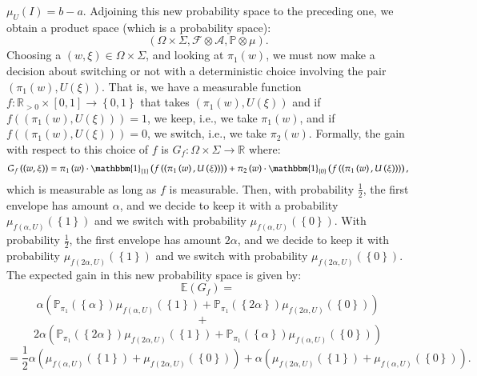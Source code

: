 \documentclass[11pt, a4paper, oneside]{article}
\theoremstyle{remark}
\theoremstyle{lemma}
\begin{document}
$\mu_{U}(I)= b-a$.
Adjoining this new probability space to the preceding one, we obtain a product space (which is a probability space):
$$\left(\Omega\times\Sigma,\mathcal{F}\otimes\mathcal{A},\mathbb{P}\otimes\mu\right).$$ Choosing a $\left(w,\xi\right)\in \Omega\times\Sigma$, and looking at $\pi_1\left(w\right)$, we must now make a decision about switching or not with a deterministic choice involving the pair $\left(\pi_1\left(w\right),U\left(\xi\right)\right)$. That is, we have a measurable function $f:\mathbb{R}_{>0}\times\left[0,1\right]\rightarrow\left\{0,1\right\}$ that takes $\left(\pi_1\left(w\right),U\left(\xi\right)\right)$ and if $f\left(\left(\pi_{1}\left(w\right),U\left(\xi\right)\right)\right)=1$, we keep, i.e., we take $\pi_1\left(w\right)$, and if $f\left(\left(\pi_{1}\left(w\right),U\left(\xi\right)\right)\right)=0$, we switch, i.e., we take $\pi_2\left(w\right)$. Formally, the gain with respect to this choice of $f$ is $G_f:\Omega\times\Sigma\rightarrow\mathbb{R}$ where:
$$G_f\left(\left(w,\xi\right)\right)=\pi_1\left(w\right)\cdot\mathbbm{1}_{\left\{1\right\}}\left(f\left(\left(\pi_{1}\left(w\right),U\left(\xi\right)\right)\right)\right)+\pi_2\left(w\right)\cdot\mathbbm{1}_{\left\{0\right\}}\left(f\left(\left(\pi_{1}\left(w\right),U\left(\xi\right)\right)\right)\right),$$
which is measurable as long as $f$ is measurable. Then, with probability $\frac{1}{2}$, the first envelope has amount $\alpha$, and we decide to keep it with a probability $\mu_{f\left(\alpha, U\right)}\left(\left\{1\right\}\right)$ and we switch with probability $\mu_{f\left(\alpha, U\right)}\left(\left\{0\right\}\right)$. With probability $\frac{1}{2}$, the first envelope has amount $2\alpha$, and we decide to keep it with probability $\mu_{f\left(2\alpha, U\right)}\left(\left\{1\right\}\right)$ and we switch with probability $\mu_{f\left(2\alpha, U\right)}\left(\left\{0\right\}\right)$. 
The expected gain in this new probability space is given by:
\[
\mathbb{E}\left(G_f\right) = 
\]
\[
\alpha\left(\mathbb{P}_{\pi_1}\left(\left\{\alpha\right\}\right)\mu_{f\left(\alpha, U\right)}\left(\left\{1\right\}\right) + \mathbb{P}_{\pi_1}\left(\left\{2\alpha\right\}\right)\mu_{f\left(2\alpha, U\right)}\left(\left\{0\right\}\right)\right)
\]
\[
+ \quad
\]
\[
2\alpha\left(\mathbb{P}_{\pi_1}\left(\left\{2\alpha\right\}\right)\mu_{f\left(2\alpha, U\right)}\left(\left\{1\right\}\right) + \mathbb{P}_{\pi_1}\left(\left\{\alpha\right\}\right)\mu_{f\left(\alpha, U\right)}\left(\left\{0\right\}\right)\right)
\]
\[
= \frac{1}{2}\alpha\left(\mu_{f\left(\alpha, U\right)}\left(\left\{1\right\}\right) + \mu_{f\left(2\alpha, U\right)}\left(\left\{0\right\}\right)\right) + \alpha\left(\mu_{f\left(2\alpha, U\right)}\left(\left\{1\right\}\right) + \mu_{f\left(\alpha, U\right)}\left(\left\{0\right\}\right)\right).
\]
\end{document}
